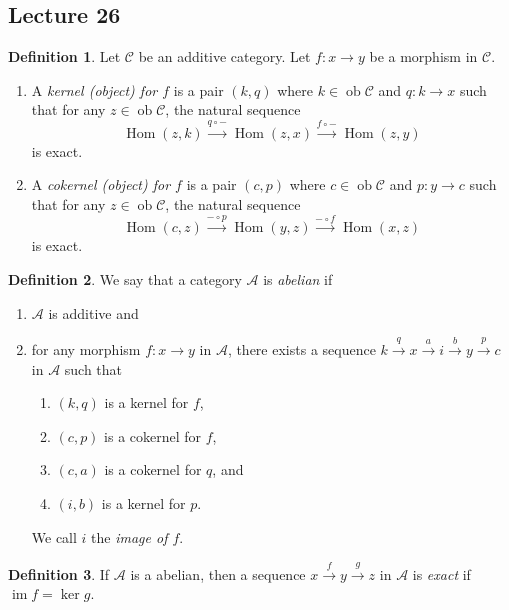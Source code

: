\documentclass[10pt,letterpaper,cm]{nupset}
\theoremstyle{definition}
\newtheorem{definition}{Definition}[subsection]
\theoremstyle{theorem}
\theoremstyle{remark}
\newcommand{\1}{\mathbf{1}}
\renewcommand{\a}{\mathscr{A}}
\renewcommand{\c}{\mathscr{C}}
\newcommand{\0}{\vec 0}
\DeclareMathOperator{\im}{im}
\DeclareMathOperator{\ob}{ob}
\DeclareMathOperator{\Hom}{Hom}
\begin{document}
\subsection{Lecture 26}

\begin{definition}
Let $\c$ be an additive category. Let $f: x \to y$ be a morphism in $\c$. 
\begin{enumerate}
\item A \textit{kernel (object) for $f$} is a pair $(k, q)$ where $k \in \ob{\c}$ and $q : k \to x$ such that for any $z \in \ob{\c}$, the natural sequence $$ \Hom(z,k) \overset{q\circ {-}}{\longrightarrow} \Hom(z,x) \overset{f\circ {-}}{\longrightarrow} \Hom(z,y)   $$ is exact.
\item  A \textit{cokernel (object) for $f$} is a pair $(c, p)$ where $c \in \ob{\c}$ and $p : y \to c$ such that for any $z \in \ob{\c}$, the natural sequence $$ \Hom(c,z) \overset{{-}\circ p}{\longrightarrow} \Hom(y,z) \overset{{-}\circ f}{\longrightarrow} \Hom(x,z)   $$ is exact.
\end{enumerate}
\end{definition}

\begin{definition}
We say that a category $\a$ is \textit{abelian} if
\begin{enumerate}
\item $\a$ is additive and
\item for any morphism $f : x \to y$ in $\a$, there exists a sequence $k \overset{q}{\longrightarrow} x  \overset{a}{\longrightarrow} i \overset{b}{\longrightarrow}y \overset{p}{\longrightarrow} c$ in $\a$ such that
\begin{enumerate}
\item $(k, q)$ is a kernel for $f$,
\item $(c, p)$ is a cokernel for $f$,
\item $(c, a)$ is a cokernel for $q$, and
\item $(i,b)$ is a kernel for $p$.
\end{enumerate}
We call $i$ the \textit{image of $f$}.
\end{enumerate}
\end{definition}

\begin{definition}
If $\a$ is a abelian, then a sequence $x \overset{f}{\longrightarrow} y \overset{g}{\longrightarrow} z$ in $\a$ is \textit{exact} if $\im{f} = \ker{g}$.
\end{definition}
\end{document}
